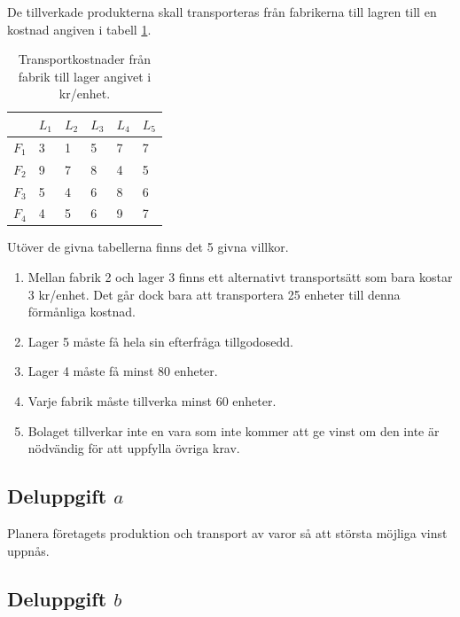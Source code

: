 \documentclass[titlepage, a4paper]{article}
\begin{document}
De tillverkade produkterna skall transporteras från fabrikerna till lagren till en kostnad angiven i tabell \ref{transportkostnader}.

\begin{table}[h!]
    \centering
    \begin{tabular}{ | l | l | l | l | l | l | }
        \hline
        {} & {$L_{1}$} & {$L_{2}$} & {$L_{3}$} & {$L_{4}$} & {$L_{5}$} \\\hline
        {$F_{1}$} & {3} & {1} & {5} & {7} & {7} \\\hline
        {$F_{2}$} & {9} & {7} & {8} & {4} & {5} \\\hline
        {$F_{3}$} & {5} & {4} & {6} & {8} & {6} \\\hline
        {$F_{4}$} & {4} & {5} & {6} & {9} & {7} \\\hline
    \end{tabular}
    \caption{Transportkostnader från fabrik till lager angivet i kr/enhet.} \label{transportkostnader}
\end{table}

Utöver de givna tabellerna finns det 5 givna villkor.

\begin{enumerate}
\item{Mellan fabrik 2 och lager 3 finns ett alternativt transportsätt som bara kostar 3 kr/enhet. Det går dock bara att transportera 25 enheter till denna förmånliga kostnad.} \label{bivillkor1}
\item{Lager 5 måste få hela sin efterfråga tillgodosedd.} \label{bivillkor2}
\item{Lager 4 måste få minst 80 enheter.} \label{bivillkor3}
\item{Varje fabrik måste tillverka minst 60 enheter.} \label{bivillkor4}
\item{Bolaget tillverkar inte en vara som inte kommer att ge vinst om den inte är nödvändig för att uppfylla övriga krav.} \label{bivillkor5}
\end{enumerate}


\subsection{Deluppgift $a$}

Planera företagets produktion och transport av varor så att största möjliga vinst uppnås.

\subsection{Deluppgift $b$}
\end{document}
